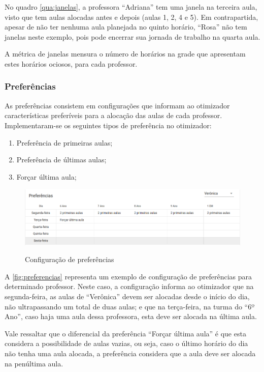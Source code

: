 No quadro \ref{qua:janelas}, a professora ``Adriana'' tem uma janela na terceira aula, visto que tem aulas alocadas antes e depois (aulas 1, 2, 4 e 5). Em contrapartida, apesar de não ter nenhuma aula planejada no quinto horário, ``Rosa'' não tem janelas neste exemplo, pois pode encerrar sua jornada de trabalho na quarta aula.

A métrica de janelas mensura o número de horários na grade que apresentam estes horários ociosos, para cada professor.

\subsubsection{Preferências}

As preferências consistem em configurações que informam ao otimizador características preferíveis para a alocação das aulas de cada professor. Implementaram-se os seguintes tipos de preferência no otimizador:

\begin{enumerate}
	\item Preferência de primeiras aulas;
	\item Preferência de últimas aulas;
	\item Forçar última aula;
\end{enumerate}

\begin{figure}[!htb]
	\centering
	\caption{Configuração de preferências}
	\includegraphics[width=1\textwidth]{./dados/figuras/preferencias}
	\label{fig:preferencias}
\end{figure}

A \autoref{fig:preferencias} representa um exemplo de configuração de preferências para determinado professor. Neste caso, a configuração informa ao otimizador que na segunda-feira, as aulas de ``Verônica'' devem ser alocadas desde o início do dia, não ultrapassando um total de duas aulas; e que na terça-feira, na turma do ``6º Ano'', caso haja uma aula dessa professora, esta deve ser alocada na última aula.

Vale ressaltar que o diferencial da preferência ``Forçar última aula'' é que esta considera a possibilidade de aulas vazias, ou seja, caso o último horário do dia não tenha uma aula alocada, a preferência considera que a aula deve ser alocada na penúltima aula.

